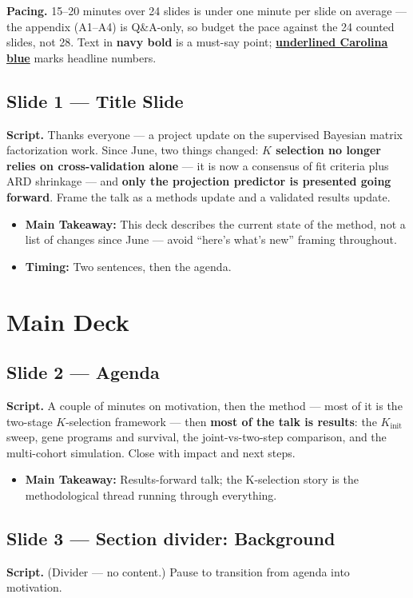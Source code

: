 \documentclass[11pt]{article}
\newcommand{\scriptlabel}{\textbf{Script. }}
\newcommand{\sectionlabel}[1]{\textbf{#1}}
\newcommand{\key}[1]{\textcolor{keyblue}{\textbf{#1}}}        %
\newcommand{\num}[1]{\textcolor{keycar}{\textbf{\uline{#1}}}} %
\begin{document}
\noindent\textbf{Pacing.} 15--20 minutes over 24 slides is under one minute per slide on average ---
the appendix (A1--A4) is Q\&A-only, so budget the pace against the 24 counted slides, not 28. Text in
\key{navy bold} is a must-say point; \num{underlined Carolina blue} marks headline numbers.

\subsection*{Slide 1 --- Title Slide}
\scriptlabel Thanks everyone --- a project update on the supervised Bayesian matrix factorization
work. Since June, two things changed: \key{$K$ selection no longer relies on cross-validation alone}
--- it is now a consensus of fit criteria plus ARD shrinkage --- and \key{only the projection
predictor is presented going forward}. Frame the talk as a methods update and a validated results
update.

\begin{itemize}
\item \sectionlabel{Main Takeaway:} This deck describes the current state of the method, not a
list of changes since June --- avoid ``here's what's new'' framing throughout.
\item \sectionlabel{Timing:} Two sentences, then the agenda.
\end{itemize}

\section*{Main Deck}

\subsection*{Slide 2 --- Agenda}
\scriptlabel A couple of minutes on motivation, then the method --- most of it is the two-stage
$K$-selection framework --- then \key{most of the talk is results}: the $K_\text{init}$ sweep, gene
programs and survival, the joint-vs-two-step comparison, and the multi-cohort simulation. Close with
impact and next steps.

\begin{itemize}
\item \sectionlabel{Main Takeaway:} Results-forward talk; the K-selection story is the methodological
thread running through everything.
\end{itemize}

\subsection*{Slide 3 --- Section divider: Background}
\scriptlabel (Divider --- no content.) Pause to transition from agenda into motivation.
\end{document}

